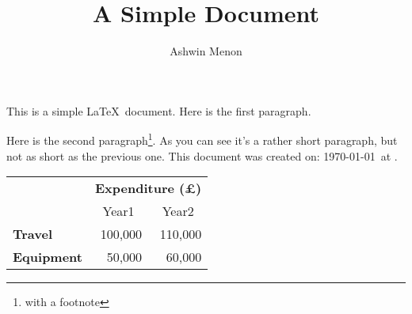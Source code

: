 \documentclass[12pt]{scrartcl}
\title{A Simple Document}
\author{Ashwin Menon}
\begin{document}
\maketitle

This is a simple \LaTeX\ document. Here is the first paragraph.

Here is the second paragraph\footnote{with a footnote}. As you
can see it's a rather short paragraph, but not as short as the
previous one. This document was created on: \today\ at \currenttime.

\begin{tabular}{lrr}
                     & \multicolumn{2}{c}{\bfseries Expenditure (\pounds)} \\
                     & \multicolumn{1}{c}{Year1} & \multicolumn{1}{c}{Year2} \\
 \bfseries Travel    & 100,000 & 110,000 \\
 \bfseries Equipment & 50,000  & 60,000
\end{tabular}
\end{document}
